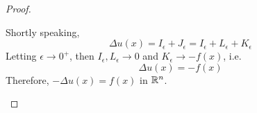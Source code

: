 \begin{thm}
\begin{proof}
\begin{enumerate}
				\vspace{1em}
				
				Shortly speaking, 
				\[
					\Delta u(x) = I_\epsilon + J_\epsilon 
					= I_\epsilon + L_\epsilon + K_\epsilon
				\]
				Letting $\epsilon \to 0^+$, then $I_\epsilon , L_\epsilon \to 0$ and $K_\epsilon \to -f(x)$, i.e.
				\[ \Delta u(x) = -f(x) \]
				Therefore, $-\Delta u(x) = f(x)$ in $\mathbb{R}^n$.
			\end{enumerate}
		\end{proof}
	\end{thm}



	\ifx\allfiles\undefined

\fi